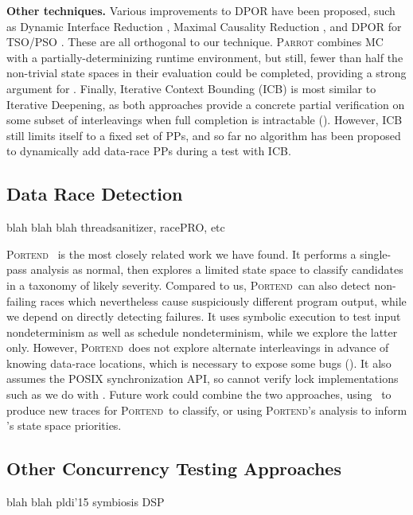 {\bf Other techniques.} Various improvements to DPOR have been proposed, such as Dynamic Interface Reduction \cite{demeter}, Maximal Causality Reduction \cite{mcr}, and DPOR for TSO/PSO \cite{tsopso}.
These are all orthogonal to our technique.
\textsc{Parrot} \cite{parrot} combines MC with a partially-determinizing runtime environment, but still, fewer than half the non-trivial state spaces in their evaluation could be completed, providing a strong argument for \quicksand.
Finally, Iterative Context Bounding (ICB) \cite{chess-icb} is most similar to Iterative Deepening, as both approaches provide a concrete partial verification on some subset of interleavings when full completion is intractable (\sect{\ref{sec:future}}).
However, ICB still limits itself to a fixed set of PPs, and so far no algorithm has been proposed to dynamically add data-race PPs during a test with ICB.

\subsection{Data Race Detection}

blah blah blah threadsanitizer, racePRO, etc

\newcommand\portend{\textsc{Portend}}
\portend~\cite{portend} is the most closely related work we have found.
It performs a single-pass analysis as normal, then explores a limited state space to classify candidates in a taxonomy of likely severity.
Compared to us, \portend~can also detect non-failing races which nevertheless cause suspiciously different program output,
while we depend on directly detecting failures.
It uses symbolic execution to test input nondeterminism as well as schedule nondeterminism,
while we explore the latter only.
However, \portend~does not explore alternate interleavings in advance of knowing data-race locations,
which is necessary to expose some bugs (\sect{\ref{sec:eval-falseneg}}).
It also assumes the POSIX synchronization API, so cannot verify lock implementations such as we do with \mxtest.
Future work could combine the two approaches, using \landslide~to produce new traces for \portend~to classify, or using \portend's analysis to inform \quicksand's state space priorities.

\subsection{Other Concurrency Testing Approaches} %

blah blah pldi'15 symbiosis DSP

